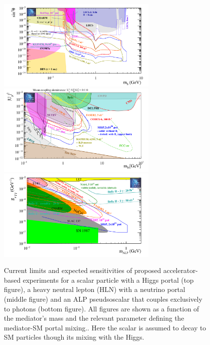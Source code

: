 \documentclass[../report.tex]{subfiles}
\begin{document}
\begin{figure}
   \centering
    \includegraphics[width=0.7\textwidth]{Darkmatter/section3/BC4_pbc_2.png}\\
    \includegraphics[width=0.7\textwidth]{Darkmatter/section3/HNL_bc7_pbc_2.png} \\
    \includegraphics[width=0.7\textwidth]{Darkmatter/section3/ALPS_gg_pbc_2.png}
   \caption{ Current limits and expected sensitivities of proposed accelerator-based  experiments %
   for a scalar particle with a Higgs portal (top figure), a heavy neutral lepton (HLN)  with a neutrino portal (middle figure) and an ALP pseudsoscalar that couples exclusively to photons (bottom figure). All figures are shown as a  function of the mediator's mass and the relevant parameter defining the mediator-SM portal mixing..
   Here  the scalar is assumed to decay to SM particles though its mixing with the Higgs. 
}
\end{figure}
\end{document}
